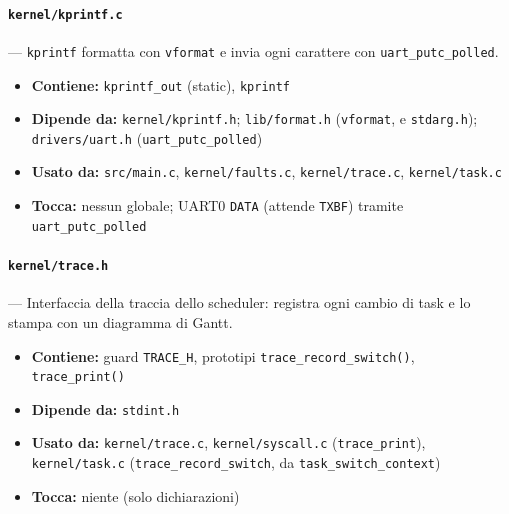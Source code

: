 \paragraph{\texttt{kernel/kprintf.c}} --- \texttt{kprintf} formatta con \texttt{vformat} e invia ogni carattere con \texttt{uart\_putc\_polled}.
\begin{itemize}
  \item \textbf{Contiene:} \texttt{kprintf\_out} (static), \texttt{kprintf}
  \item \textbf{Dipende da:} \texttt{kernel/kprintf.h}; \texttt{lib/format.h} (\texttt{vformat}, e \texttt{stdarg.h}); \texttt{drivers/uart.h} (\texttt{uart\_putc\_polled})
  \item \textbf{Usato da:} \texttt{src/main.c}, \texttt{kernel/faults.c}, \texttt{kernel/trace.c}, \texttt{kernel/task.c}
  \item \textbf{Tocca:} nessun globale; UART0 \texttt{DATA} (attende \texttt{TXBF}) tramite \texttt{uart\_putc\_polled}
\end{itemize}

\paragraph{\texttt{kernel/trace.h}} --- Interfaccia della traccia dello scheduler: registra ogni cambio di task e lo stampa con un diagramma di Gantt.
\begin{itemize}
  \item \textbf{Contiene:} guard \texttt{TRACE\_H}, prototipi \texttt{trace\_record\_switch()}, \texttt{trace\_print()}
  \item \textbf{Dipende da:} \texttt{stdint.h}
  \item \textbf{Usato da:} \texttt{kernel/trace.c}, \texttt{kernel/syscall.c} (\texttt{trace\_print}), \texttt{kernel/task.c} (\texttt{trace\_record\_switch}, da \texttt{task\_switch\_context})
  \item \textbf{Tocca:} niente (solo dichiarazioni)
\end{itemize}

